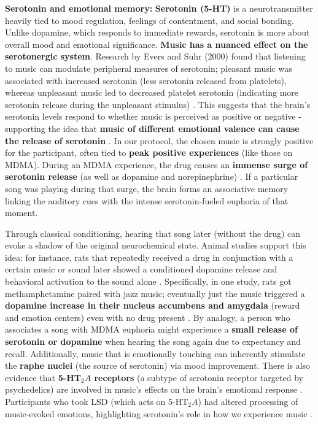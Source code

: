 \documentclass[11pt]{article}
\begin{document}
\textbf{Serotonin and emotional memory:} \textbf{Serotonin (5-HT)} is a neurotransmitter heavily tied to mood regulation, feelings of contentment, and social bonding. Unlike dopamine, which responds to immediate rewards, serotonin is more about overall mood and emotional significance. \textbf{Music has a nuanced effect on the serotonergic system}. Research by Evers and Suhr (2000) found that listening to music can modulate peripheral measures of serotonin; pleasant music was associated with increased serotonin (less serotonin released from platelets), whereas unpleasant music led to decreased platelet serotonin (indicating more serotonin release during the unpleasant stimulus) \cite{brainMuriel}. This suggests that the brain's serotonin levels respond to whether music is perceived as positive or negative - supporting the idea that \textbf{music of different emotional valence can cause the release of serotonin} \cite{brainMuriel}. In our protocol, the chosen music is strongly positive for the participant, often tied to \textbf{peak positive experiences} (like those on MDMA). During an MDMA experience, the drug causes an \textbf{immense surge of serotonin release} (as well as dopamine and norepinephrine) \cite{jyiSeekingHappiness}. If a particular song was playing during that surge, the brain forms an associative memory linking the auditory cues with the intense serotonin-fueled euphoria of that moment.

Through classical conditioning, hearing that song later (without the drug) can evoke a shadow of the original neurochemical state. Animal studies support this idea: for instance, rats that repeatedly received a drug in conjunction with a certain music or sound later showed a conditioned dopamine release and behavioral activation to the sound alone \cite{Polston2011}. Specifically, in one study, rats got methamphetamine paired with jazz music; eventually just the music triggered a \textbf{dopamine increase in their nucleus accumbens and amygdala}
 (reward and emotion centers) even with no drug present \cite{Polston2011}. By analogy, a person who associates a song with MDMA euphoria might experience a \textbf{small release of serotonin or dopamine} when hearing the song again due to expectancy and recall. Additionally, music that is emotionally touching can inherently stimulate the \textbf{raphe nuclei
} (the source of serotonin) via mood improvement. There is also evidence that \textbf{5-HT$_2A$ receptors} (a subtype of serotonin receptor targeted by psychedelics) are involved in music's effects on the brain's emotional response \cite{brainMuriel}. Participants who took LSD (which acts on 5-HT$_2A$) had altered processing of music-evoked emotions, highlighting serotonin's role in how we experience music \cite{brainMuriel}.
\end{document}
